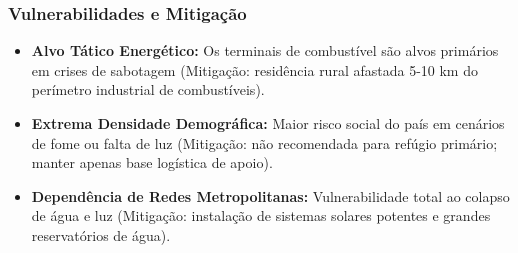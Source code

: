 \subsubsection{Vulnerabilidades e
Mitigação}

\begin{itemize}
\tightlist
\item
  \textbf{Alvo Tático Energético:} Os terminais de combustível são alvos
  primários em crises de sabotagem (Mitigação: residência rural afastada
  5-10 km do perímetro industrial de combustíveis).
\item
  \textbf{Extrema Densidade Demográfica:} Maior risco social do país em
  cenários de fome ou falta de luz (Mitigação: não recomendada para
  refúgio primário; manter apenas base logística de apoio).
\item
  \textbf{Dependência de Redes Metropolitanas:} Vulnerabilidade total ao
  colapso de água e luz (Mitigação: instalação de sistemas solares
  potentes e grandes reservatórios de água).
\end{itemize}

